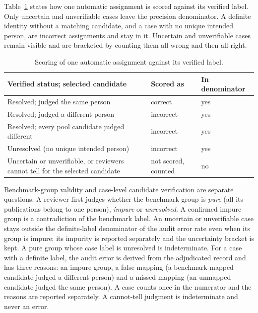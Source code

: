 Table~\ref{tab:scoring} states how one automatic assignment is scored against its verified label. Only uncertain and unverifiable cases leave the precision denominator. A definite identity without a matching candidate, and a case with no unique intended person, are incorrect assignments and stay in it. Uncertain and unverifiable cases remain visible and are bracketed by counting them all wrong and then all right.

\begin{table}[t]
\caption{Scoring of one automatic assignment against its verified label.}
\label{tab:scoring}
\centering
\footnotesize
\renewcommand{\arraystretch}{1.1}
\begin{tabular}{@{}p{}p{}p{}@{}}
\toprule
\textbf{Verified status; selected candidate} & \textbf{Scored as} & \textbf{In denominator} \\
\midrule
Resolved; judged the same person & correct & yes \\
Resolved; judged a different person & incorrect & yes \\
Resolved; every pool candidate judged different & incorrect & yes \\
Unresolved (no unique intended person) & incorrect & yes \\
Uncertain or unverifiable, or reviewers cannot tell for the selected candidate & not scored, counted & no \\
\bottomrule
\end{tabular}
\end{table}

Benchmark-group validity and case-level candidate verification are separate questions. A reviewer first judges whether the benchmark group is \emph{pure} (all its publications belong to one person), \emph{impure} or \emph{unresolved}. A confirmed impure group is a contradiction of the benchmark label. An uncertain or unverifiable case stays outside the definite-label denominator of the audit error rate even when its group is impure; its impurity is reported separately and the uncertainty bracket is kept. A pure group whose case label is unresolved is indeterminate. For a case with a definite label, the audit error is derived from the adjudicated record and has three reasons: an impure group, a false mapping (a benchmark-mapped candidate judged a different person) and a missed mapping (an unmapped candidate judged the same person). A case counts once in the numerator and the reasons are reported separately. A cannot-tell judgment is indeterminate and never an error.

